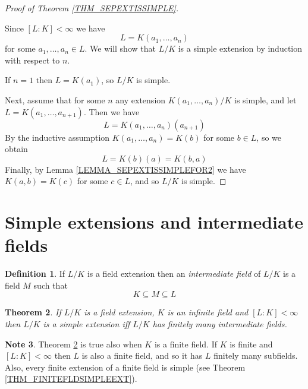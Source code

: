 \documentclass[12pt, letterpaper, oneside]{article}
\theoremstyle{plain}
\newtheorem{theorem}{Theorem}[section]
\theoremstyle{definition}
\newtheorem{definition}[theorem]{Definition}
\newtheorem{note}[theorem]{Note}
\newcommand{\vs}{\vskip 5mm}
\begin{document}
\begin{proof}[Proof of Theorem \ref{THM_SEPEXTISSIMPLE}] \ 

Since $[L:K]< \infty$ we have 
$$L = K(a_{1}, \dots, a_{n})$$
for some $a_{1}, \dots, a_{n}\in L$. 
We will show that $L/K$ is a simple extension by induction with respect to $n$. 

If $n=1$ then $L= K(a_{1})$, so $L/K$ is simple. 

Next, assume that for some $n$ any extension $K(a_{1}, \dots, a_{n})/K$ is simple, and 
let $L = K(a_{1}, \dots, a_{n+1})$. Then we have 
$$L = K(a_{1}, \dots, a_{n})(a_{n+1})$$
By the inductive assumption $K(a_{1}, \dots, a_{n}) = K(b)$ for some $b\in L$, so we 
obtain 
$$L= K(b)(a) = K(b, a)$$
Finally, by Lemma \ref{LEMMA_SEPEXTISSIMPLEFOR2} we have $K(a, b) = K(c)$
for some $c\in L$, and so $L/K$ is simple. 
\end{proof}











\newpage
\section{Simple extensions and intermediate fields}
\label{SEC_SIMPLEEXTINTERMFLD}

\begin{definition}
If $L/K$ is a field extension then an \emph{intermediate field} of $L/K$ is a field 
$M$ such that 
$$K\subseteq M \subseteq L$$
\end{definition}

\vs\vs

\begin{theorem}
\label{THM_SIMPEXTINTERMFLDS}
If $L/K$ is a field extension, $K$ is an infinite field and $[L:K]< \infty$  then 
$L/K$ is a simple extension iff $L/K$ has finitely many intermediate fields. 
\end{theorem}


\vs\vs

\begin{note}
 Theorem \ref{THM_SIMPEXTINTERMFLDS} is true also when 
$K$ is a finite field. If $K$ is finite and $[L:K] <\infty$ then $L$ is also a finite field, 
and so it has $L$ finitely many subfields. Also, every finite extension of a finite field
is simple (see Theorem \ref{THM_FINITEFLDSIMPLEEXT}). 
\end{note}
\end{document}
